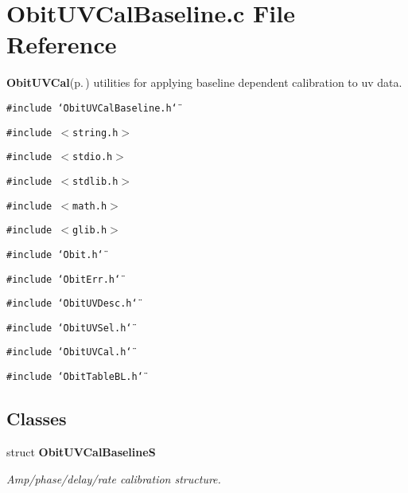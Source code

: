 \section{Obit\-UVCal\-Baseline.c File Reference}
\label{ObitUVCalBaseline_8c}
{\bf Obit\-UVCal}{\rm (p.\,\pageref{structObitUVCal})} utilities for applying baseline dependent calibration to uv data. 

{\tt \#include \char`\"{}Obit\-UVCal\-Baseline.h\char`\"{}}\par
{\tt \#include $<$string.h$>$}\par
{\tt \#include $<$stdio.h$>$}\par
{\tt \#include $<$stdlib.h$>$}\par
{\tt \#include $<$math.h$>$}\par
{\tt \#include $<$glib.h$>$}\par
{\tt \#include \char`\"{}Obit.h\char`\"{}}\par
{\tt \#include \char`\"{}Obit\-Err.h\char`\"{}}\par
{\tt \#include \char`\"{}Obit\-UVDesc.h\char`\"{}}\par
{\tt \#include \char`\"{}Obit\-UVSel.h\char`\"{}}\par
{\tt \#include \char`\"{}Obit\-UVCal.h\char`\"{}}\par
{\tt \#include \char`\"{}Obit\-Table\-BL.h\char`\"{}}\par
\subsection*{Classes}
\begin{CompactItemize}
\item 
struct {\bf Obit\-UVCal\-Baseline\-S}
\begin{CompactList}\small\item\em Amp/phase/delay/rate calibration structure. \item\end{CompactList}\end{CompactItemize}
